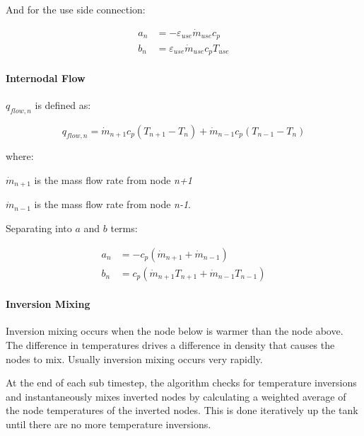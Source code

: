 And for the use side connection:

\begin{equation}
  \begin{array}{rl}
    a_n &= - \varepsilon_{use} \dot{m}_{use} c_p \\
    b_n &= \varepsilon_{use} \dot{m}_{use} c_p T_{use}
  \end{array}
\end{equation}

\paragraph{Internodal Flow}

\(q_{flow,n}\) is defined as:

\begin{equation}
{q_{flow,n}} = {\dot m_{n + 1}}{c_p}({T_{n + 1}} - {T_n}) + {\dot m_{n - 1}}{c_p}({T_{n - 1}} - {T_n})
\end{equation}

where:

\({\dot m_{n + 1}}\) is the mass flow rate from node \emph{n+1}

\({\dot m_{n - 1}}\) is the mass flow rate from node \emph{n-1}.

Separating into $a$ and $b$ terms:

\begin{equation}
  \begin{array}{rl}
    a_n &= - c_p (\dot m_{n+1} + \dot m_{n-1}) \\
    b_n &= c_p (\dot m_{n+1} T_{n+1} + \dot m_{n-1} T_{n-1})
  \end{array}
\end{equation}

\paragraph{Inversion Mixing}

Inversion mixing occurs when the node below is warmer than the node above. The difference in temperatures drives a difference in density that causes the nodes to mix. Usually inversion mixing occurs very rapidly.

At the end of each sub timestep, the algorithm checks for temperature inversions and instantaneously mixes inverted nodes by calculating a weighted average of the node temperatures of the inverted nodes. This is done iteratively up the tank until there are no more temperature inversions.

